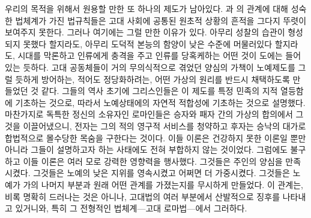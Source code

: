 우리의 목적을 위해서 원용할 만한 또 하나의  제도가 남아있다.
과 의 관계에 대해 성숙한 법체계가 가진 법규칙들은
고대 사회에 공통된 원초적 상황의 흔적을 그다지 뚜렷이 보여주지 못한다.
그러나 여기에는 그럴 만한 이유가 있다.
아무리 성찰의 습관이 형성되지 못했다 할지라도,
아무리 도덕적 본능의 함양이 낮은 수준에 머물러있다 할지라도,
시대를 막론하고 인류에게 충격을 주고 인류를 당혹케하는 어떤 것이
도에는 들어있는 듯하다.
고대 공동체들이 거의 무의식적으로 겪었던 양심의 가책이
노예제도를 그럴 듯하게 방어하는, 적어도 정당화하려는,
어떤 가상의 원리를
반드시
채택하도록 만들었던 것 같다.
그들의 역사 초기에 그리스인들은
이 제도를
특정 민족의 지적 열등함에 기초하는 것으로,
따라서 노예상태에의 자연적 적합성에 기초하는 것으로
설명했다.
마찬가지로 독특한 정신의 소유자인 로마인들은
승자와 패자 간의 가상의 합의에서 그것을 이끌어냈으니,
전자는 그의 적의 영구적 서비스를 청약하고
후자는 승낙의 대가로 합법적으로 몰수당한 목숨을 구한다는 것이다.
이들 이론은 건강하지 못한 이론일 뿐만 아니라
그들이 설명하고자 하는 사태에도 전혀 부합하지 않는 것이었다.
그럼에도 불구하고 이들 이론은 여러 모로 강력한 영향력을 행사했다.
그것들은 주인의 양심을 만족시켰다.
그것들은 노예의 낮은 지위를 영속시켰고 어쩌면 더 가중시켰다.
그것들은 노예가 가의 나머지 부분과 원래 어떤 관계를 가졌는지를
무시하게 만들었다.
이 관계는, 비록 명확히 드러나는 것은 아니나,
고대법의 여러 부분에서 산발적으로 징후를 나타내고 있거니와,
특히 그 전형적인 법체계---고대 로마법---에서 그러하다.

